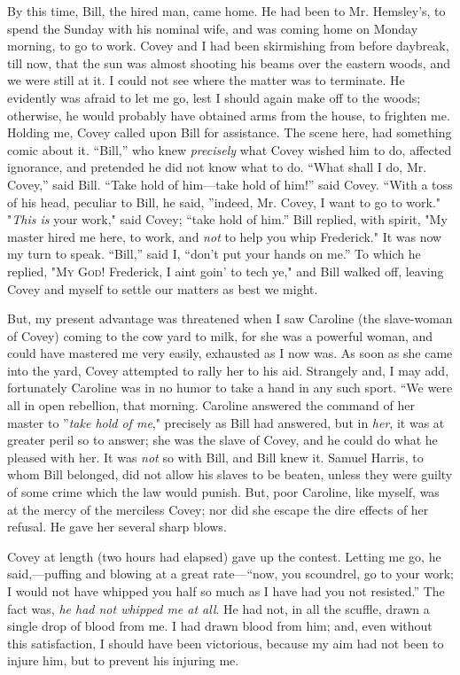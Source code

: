 By this time, Bill, the hired man, came home. He had been to Mr.
Hemsley's, to spend the Sunday with his nominal wife, and was coming
home on Monday morning, to go to work. Covey and I had been skirmishing
from before daybreak, till now, that the sun was almost shooting his
beams over the eastern woods, and we were still at it. I could not see
where the matter was to terminate. He evidently was afraid to let me go,
lest I should again make off to the woods; otherwise, he would probably
have obtained arms from the house, to frighten me. Holding me, Covey
called upon Bill for assistance. The scene here, had something comic
about it. ``Bill,'' who knew \emph{precisely}
{\protect\hypertarget{245}{}{}}what Covey wished him to do, affected
ignorance, and pretended he did not know what to do. ``What shall I do,
Mr. Covey,'' said Bill. ``Take hold of him---take hold of him!'' said
Covey. ``With a toss of his head, peculiar to Bill, he said, ''indeed,
Mr. Covey, I want to go to work." "\emph{This is} your work," said
Covey; ``take hold of him.'' Bill replied, with spirit, "My master hired
me here, to work, and \emph{not} to help you whip Frederick." It was now
my turn to speak. ``Bill,'' said I, ``don't put your hands on me.'' To
which he replied, "\textsc{My God}! Frederick, I aint goin' to tech ye,"
and Bill walked off, leaving Covey and myself to settle our matters as
best we might.

But, my present advantage was threatened when I saw Caroline (the
slave-woman of Covey) coming to the cow yard to milk, for she was a
powerful woman, and could have mastered me very easily, exhausted as I
now was. As soon as she came into the yard, Covey attempted to rally her
to his aid. Strangely and, I may add, fortunately Caroline was in no
humor to take a hand in any such sport. ``We were all in open rebellion,
that morning. Caroline answered the command of her master to
''\emph{take hold of me}," precisely as Bill had answered, but in
\emph{her}, it was at greater peril so to answer; she was the slave of
Covey, and he could do what he pleased with her. It was \emph{not} so
with Bill, and Bill knew it. Samuel Harris, to whom Bill belonged, did
not allow his slaves to be beaten, unless they were guilty of some crime
which the law would punish. But, poor Caroline, like myself, was at the
mercy of the merciless Covey; nor {\protect\hypertarget{246}{}{}}did she
escape the dire effects of her refusal. He gave her several sharp blows.

Covey at length (two hours had elapsed) gave up the contest. Letting me
go, he said,---puffing and blowing at a great rate---``now, you
scoundrel, go to your work; I would not have whipped you half so much as
I have had you not resisted.'' The fact was, \emph{he had not whipped me
at all}. He had not, in all the scuffle, drawn a single drop of blood
from me. I had drawn blood from him; and, even without this
satisfaction, I should have been victorious, because my aim had not been
to injure him, but to prevent his injuring me.

